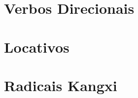 \documentclass[a4paper,9pt,twoside,openright,book]{memoir}
\begin{document}
\clearpage
\pagestyle{plain}
\chapter{Verbos Direcionais}


\clearpage
\pagestyle{plain}
\chapter{Locativos}


\clearpage
\pagestyle{plain}
\chapter{Radicais Kangxi}


\fi
\end{document}
